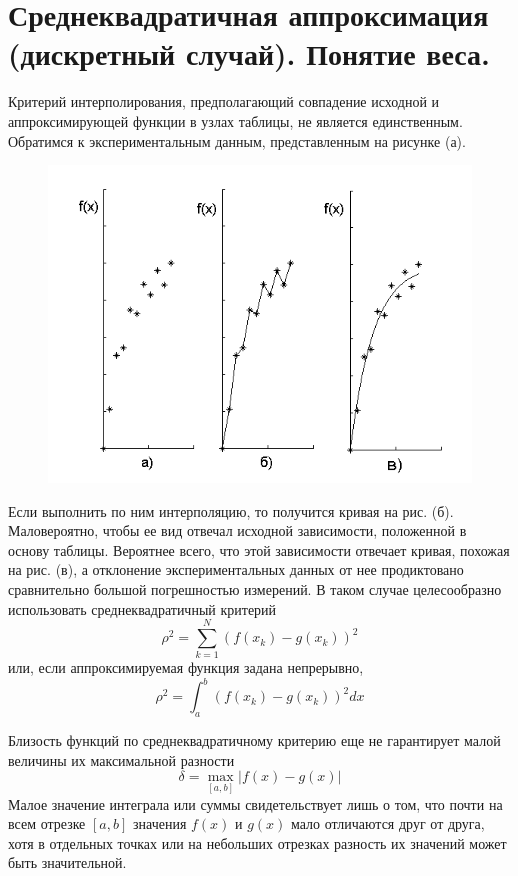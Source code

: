 \documentclass[../../calc-math-exam-2023.tex]{subfiles}
\begin{document}
    \section{Среднеквадратичная аппроксимация (дискретный случай). Понятие веса.}\label{sec:ch13}
    Критерий интерполирования, предполагающий совпадение исходной и аппроксимирующей
    функции в узлах таблицы, не является единственным. Обратимся к экспериментальным
    данным, представленным на рисунке (а).
    \begin{figure}[H]
        \centering
        \includegraphics[width=0.5\linewidth]{../images/13_1}
        \label{fig:13_1}
    \end{figure}
    Если выполнить по ним интерполяцию, то получится кривая на рис. (б). Маловероятно,
    чтобы ее вид отвечал исходной зависимости, положенной в основу таблицы. Вероятнее
    всего, что этой зависимости отвечает кривая, похожая на рис. (в), а отклонение
    экспериментальных данных от нее продиктовано сравнительно большой погрешностью
    измерений. В таком случае целесообразно использовать среднеквадратичный критерий
    \begin{equation*}
        \rho^2 = \sum_{k=1}^{N} \left( f(x_k) - g(x_k) \right)^2
    \end{equation*}
    или, если аппроксимируемая функция задана непрерывно,
    \begin{equation*}
        \rho^2 = \int_a^b \left( f(x_k) - g(x_k) \right)^2 dx
    \end{equation*}

    Близость функций по среднеквадратичному критерию еще не гарантирует малой
    величины их максимальной разности
    \begin{equation*}
        \delta = \max_{[a, b]} \left| f(x) - g(x) \right|
    \end{equation*}
    Малое значение интеграла или суммы свидетельствует лишь о том, что почти на всем
    отрезке $[a, b]$ значения $f(x)$ и $g(x)$ мало отличаются друг от друга, хотя в
    отдельных точках или на небольших отрезках разность их значений может быть
    значительной.
\end{document}
